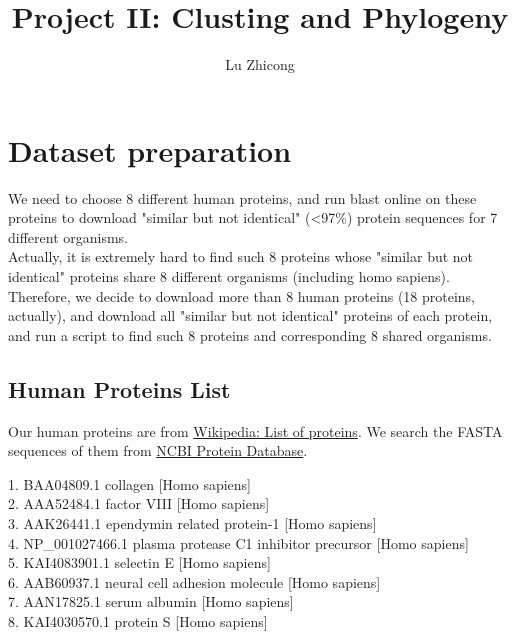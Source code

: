\documentclass[a4paper, 12pt, one column]{article}
\title{Project II: Clusting and Phylogeny}
\author{Lu Zhicong}
\begin{document}
\maketitle


\section{Dataset preparation}
We need to choose 8 different human proteins, and run blast online on these proteins to download "similar but not identical" (<97\%) protein sequences for 7 different organisms. \\
Actually, it is extremely hard to find such 8 proteins whose "similar but not identical" proteins  share 8 different organisms (including homo sapiens).\\
Therefore, we decide to download more than 8 human proteins (18 proteins, actually), and download all "similar but not identical" proteins of each protein, and run a script to find such 8 proteins and corresponding 8 shared organisms. 






\subsection{Human Proteins List}
Our human proteins are from \href{https://en.wikipedia.org/wiki/List_of_proteins}{Wikipedia: List of proteins}. We search the FASTA sequences of them from \href{https://www.ncbi.nlm.nih.gov/protein}{NCBI Protein Database}.

1. BAA04809.1 collagen [Homo sapiens] \\
2. AAA52484.1 factor VIII [Homo sapiens] \\
3. AAK26441.1 ependymin related protein-1 [Homo sapiens] \\
4. NP\_001027466.1 plasma protease C1 inhibitor precursor [Homo sapiens] \\
5. KAI4083901.1 selectin E [Homo sapiens] \\
6. AAB60937.1 neural cell adhesion molecule [Homo sapiens] \\
7. AAN17825.1 serum albumin [Homo sapiens] \\
8. KAI4030570.1 protein S [Homo sapiens] \\
\end{document}
